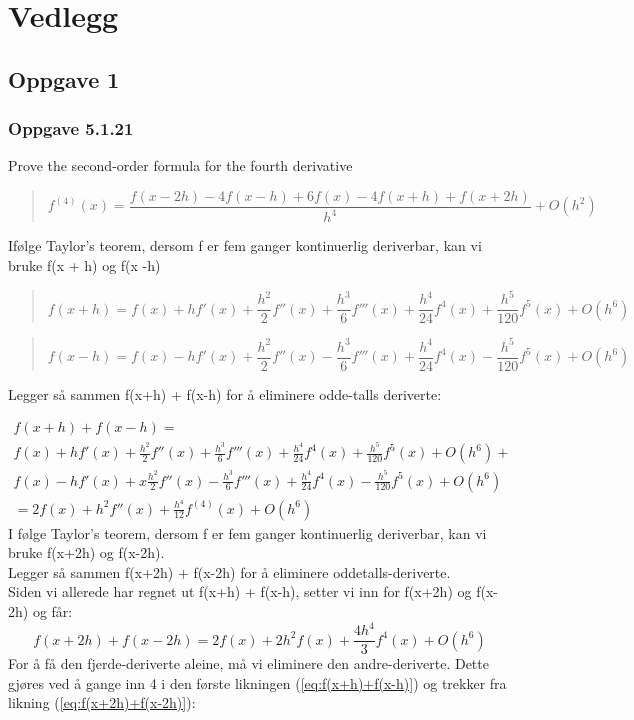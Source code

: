 \section{Vedlegg}

\subsection{Oppgave 1}
\subsubsection{Oppgave 5.1.21}
Prove the second-order formula for the fourth derivative
\begin{quote}
\begin{equation}\label{eq:oppgave1}
f^{(4)} (x) = \frac{f(x-2h) - 4f(x-h) + 6f(x) - 4f(x+h) + f(x+2h)}{h^4} + O(h^2)
\end{equation}
\end{quote}
Ifølge Taylor's teorem, dersom f er fem ganger kontinuerlig deriverbar, 
kan vi bruke f(x + h) og f(x -h)
\begin{quote}
\begin{equation} \label{eq:f(x+h)}
f(x+h) = f(x) + hf'(x) + \frac{h^2}{2} f''(x) + \frac{h^3}{6} f'''(x) + \frac{h^4}{24} f^4 (x) + \frac{h^5}{120} f^5 (x) + O(h^6)
\end{equation}
\end{quote}
\begin{quote}
\begin{equation} \label{eq:f(x-h)}
f(x-h) = f(x) - hf'(x) + \frac{h^2}{2} f''(x) - \frac{h^3}{6} f'''(x) + \frac{h^4}{24} f^4 (x) - \frac{h^5}{120} f^5 (x) + O(h^6)
\end{equation}
\end{quote}
Legger så sammen f(x+h) + f(x-h) for å eliminere odde-talls deriverte:

\begin{multline} \label{eq:f(x+h)+f(x-h)}
f(x+h) + f(x-h) = \\f(x) + hf'(x) + \frac{h^2}{2} f''(x) + \frac{h^3}{6} f'''(x) + \frac{h^4}{24} f^4 (x) + \frac{h^5}{120} f^5 (x) + O(h^6) +\\
 f(x) - hf'(x) + x\frac{h^2}{2} f''(x) - \frac{h^3}{6} f'''(x) + \frac{h^4}{24} f^4 (x) - \frac{h^5}{120} f^5 (x) + O(h^6) \\ = 2f(x) + h^2 f''(x) + \frac{h^4}{12} f^{(4)} (x) + O (h^6)
\end{multline}
I følge Taylor's teorem, dersom f er fem ganger kontinuerlig deriverbar, kan vi bruke f(x+2h) og f(x-2h). \\
Legger så sammen f(x+2h) + f(x-2h) for å eliminere oddetalls-deriverte. \\
Siden vi allerede har regnet ut f(x+h) + f(x-h), setter vi inn for f(x+2h) og f(x-2h) og får:
\begin{equation} \label{eq:f(x+2h)+f(x-2h)}
f(x+2h) + f(x-2h) = 2f(x) + 2h^2 f(x) + \frac{4h^4}{3} f^4 (x) + O (h^6)
\end{equation}
For å få den fjerde-deriverte aleine, må vi eliminere den andre-deriverte. Dette gjøres ved å gange inn 4 i den første likningen (\ref{eq:f(x+h)+f(x-h)}) og trekker fra likning (\ref{eq:f(x+2h)+f(x-2h)}): 

